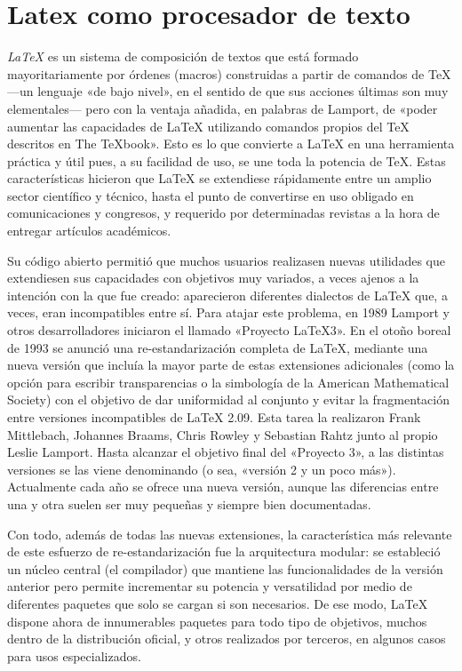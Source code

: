
\section{Latex como procesador de texto} %
  \label{sec:latex_como_procesador_de_texto}
  
  {\it LaTeX} es un sistema de composición de textos que está formado mayoritariamente por órdenes (macros) construidas a partir de comandos de TeX —un lenguaje «de bajo nivel», en el sentido de que sus acciones últimas son muy elementales— pero con la ventaja añadida, en palabras de Lamport, de «poder aumentar las capacidades de LaTeX utilizando comandos propios del TeX descritos en The TeXbook». Esto es lo que convierte a LaTeX en una herramienta práctica y útil pues, a su facilidad de uso, se une toda la potencia de TeX. Estas características hicieron que LaTeX se extendiese rápidamente entre un amplio sector científico y técnico, hasta el punto de convertirse en uso obligado en comunicaciones y congresos, y requerido por determinadas revistas a la hora de entregar artículos académicos.
  
  Su código abierto permitió que muchos usuarios realizasen nuevas utilidades que extendiesen sus capacidades con objetivos muy variados, a veces ajenos a la intención con la que fue creado: aparecieron diferentes dialectos de LaTeX que, a veces, eran incompatibles entre sí. Para atajar este problema, en 1989 Lamport y otros desarrolladores iniciaron el llamado «Proyecto LaTeX3». En el otoño boreal de 1993 se anunció una re-estandarización completa de LaTeX, mediante una nueva versión que incluía la mayor parte de estas extensiones adicionales (como la opción para escribir transparencias o la simbología de la American Mathematical Society) con el objetivo de dar uniformidad al conjunto y evitar la fragmentación entre versiones incompatibles de LaTeX 2.09. Esta tarea la realizaron Frank Mittlebach, Johannes Braams, Chris Rowley y Sebastian Rahtz junto al propio Leslie Lamport. Hasta alcanzar el objetivo final del «Proyecto 3», a las distintas versiones se las viene denominando  (o sea, «versión 2 y un poco más»). Actualmente cada año se ofrece una nueva versión, aunque las diferencias entre una y otra suelen ser muy pequeñas y siempre bien documentadas.
  
  Con todo, además de todas las nuevas extensiones, la característica más relevante de este esfuerzo de re-estandarización fue la arquitectura modular: se estableció un núcleo central (el compilador) que mantiene las funcionalidades de la versión anterior pero permite incrementar su potencia y versatilidad por medio de diferentes paquetes que solo se cargan si son necesarios. De ese modo, LaTeX dispone ahora de innumerables paquetes para todo tipo de objetivos, muchos dentro de la distribución oficial, y otros realizados por terceros, en algunos casos para usos especializados.

